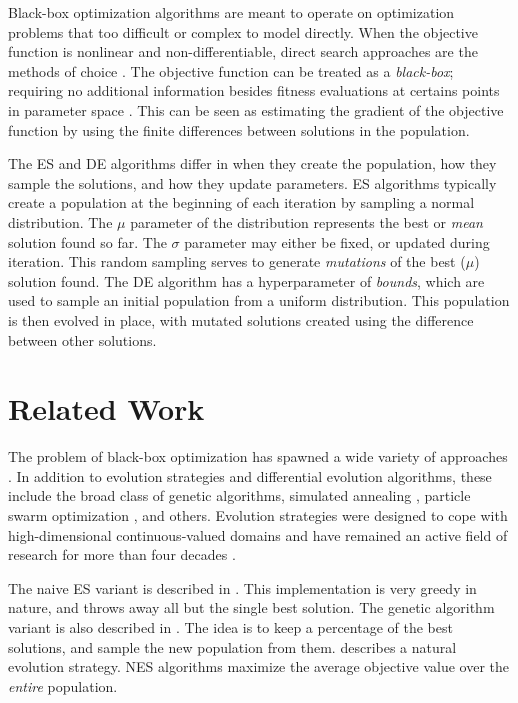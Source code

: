 \documentclass[conference]{IEEEtran}
\begin{document}
Black-box optimization algorithms are meant to operate on optimization problems that too difficult or complex to model directly. When the objective 
function is nonlinear and non-differentiable, direct search approaches are the methods of choice \cite{de}. The objective function can be treated as 
a \emph{black-box}; requiring no additional information besides fitness evaluations at certains points in parameter space \cite{nes}. This can be seen 
as estimating the gradient of the objective function by using the finite differences between solutions in the population.

The ES and DE algorithms differ in when they create the population, how they sample the solutions, and how they update parameters. 
ES algorithms typically create a population at the beginning of each iteration by sampling a normal distribution. The $\mu$ parameter of the 
distribution represents the best or \emph{mean} solution found so far. The $\sigma$ parameter may either be fixed, or updated during iteration. This 
random sampling serves to generate \emph{mutations} of the best ($\mu$) solution found. The DE algorithm has a hyperparameter of \emph{bounds}, 
which are used to sample an initial population from a uniform distribution. This population is then evolved in place, with mutated solutions 
created using the difference between other solutions. 

\section{Related Work}
The problem of black-box optimization has spawned a wide variety of approaches \cite{nes}. In addition to evolution strategies and differential 
evolution algorithms, these include the broad class of genetic algorithms, simulated annealing \cite{sim}, particle swarm optimization \cite{part}, 
and others. Evolution strategies were designed to cope with high-dimensional continuous-valued domains and have remained an active field of research 
for more than four decades \cite{es}. 

The naive ES variant is described in \cite{otoro}. This implementation is very greedy in nature, and throws away all but the single best solution. 
The genetic algorithm variant is also described in \cite{otoro}. The idea is to keep a percentage of the best solutions, and sample the new population 
from them. \cite{openai} describes a natural evolution strategy. NES algorithms maximize the average objective value over the \emph{entire} population.
\end{document}
